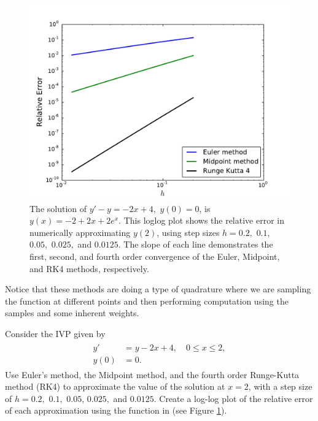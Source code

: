 \begin{figure}[ht]
\centering
\includegraphics[width=\textwidth]{relative_error.pdf}
\caption{The solution of $y' -y= -2x+4,$ $y(0) = 0$, is $y(x) = -2+2x + 2e^x.$ This loglog plot shows the relative error in numerically approximating $y(2)$, using step sizes $h = 0.2,$ $0.1,$ $0.05,$ $0.025,$ and $0.0125$. The slope of each line demonstrates the first, second, and fourth order convergence of the Euler, Midpoint, and RK4 methods, respectively.}
\label{ivp:relative_error}
\end{figure}

Notice that these methods are doing a type of quadrature where we are sampling the function at different points and then performing computation using the samples and some inherent weights.

\begin{problem} Consider the IVP given by
\begin{align*}
	\begin{split}
y' &= y - 2x + 4,\quad 0 \leq x \leq 2, \\
y(0) &= 0.
	\end{split} \label{ivp:prob2}
\end{align*}
Use Euler's method, the Midpoint method, and the fourth order Runge-Kutta method (RK4) to approximate the value of the solution at $x = 2$, with a step size of $h = 0.2,$ $ 0.1,$ $0.05 $, $0.025,$ and $0.0125.$ 
Create a log-log plot of the relative error of each approximation using the  function in  (see Figure \ref{ivp:relative_error}).
\end{problem}

